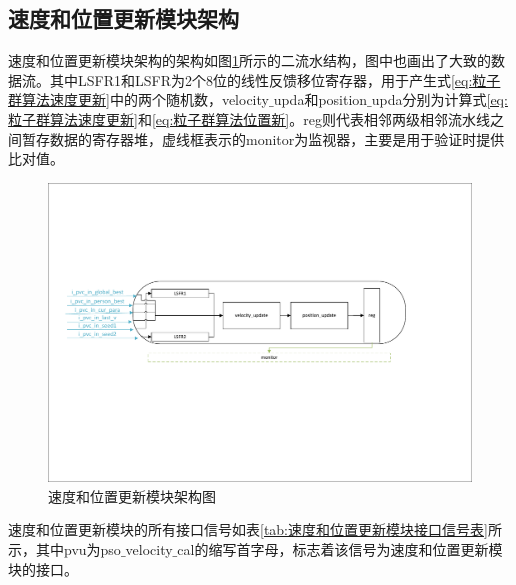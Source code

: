 \subsection{速度和位置更新模块架构}
速度和位置更新模块架构的架构如图\ref{fig:速度和位置更新模块架构图}所示的二流水结构，图中也画出了大致的数据流。其中LSFR1和LSFR为2个8位的线性反馈移位寄存器，用于产生式\eqref{eq:粒子群算法速度更新}中的两个随机数，velocity$\_$upda和position$\_$upda分别为计算式\eqref{eq:粒子群算法速度更新}和\eqref{eq:粒子群算法位置新}。reg则代表相邻两级相邻流水线之间暂存数据的寄存器堆，虚线框表示的monitor为监视器，主要是用于验证时提供比对值。
\begin{figure}[htb]
    \centering
    \includegraphics[width=14cm]{fig/5-fig/速度和位置更新模块架构图.pdf}
    \caption{速度和位置更新模块架构图}
    \label{fig:速度和位置更新模块架构图}
\end{figure}

速度和位置更新模块的所有接口信号如表\ref{tab:速度和位置更新模块接口信号表}所示，其中pvu为pso$\_$velocity$\_$cal的缩写首字母，标志着该信号为速度和位置更新模块的接口。


